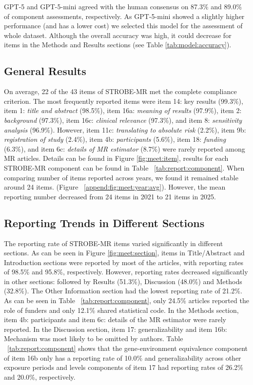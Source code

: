 GPT-5 and GPT-5-mini agreed with the human consensus on 87.3\% and 89.0\% of component assessments, respectively. As GPT-5-mini showed a slightly higher performance (and has a lower cost) we selected this model for the assessment of whole dataset. Although the overall accuracy was high, it could decrease for items in the Methods and Results sections (see Table \ref{tab:model:accuracy}).




\subsection{General Results}

On average, 22 of the 43 items of STROBE-MR met the complete compliance criterion. The most frequently reported items were item 14: key results (99.3\%), item 1: \textit{title and abstract} (98.5\%), item 16a: \textit{meaning of results} (97.9\%), item 2: \textit{background} (97.3\%), item 16c: \textit{clinical relevance} (97.3\%), and item 8: \textit{sensitivity analysis} (96.9\%). However, item 11c: \textit{translating to absolute risk} (2.2\%), item 9b: \textit{registration of study} (2.4\%), item 4b: \textit{participants} (5.6\%), item 18: \textit{funding} (6.3\%), and item 6c: \textit{details of MR estimator} (8.7\%) were rarely reported among MR articles. Details can be found in Figure \ref{fig:meet:item}, results for each STROBE-MR component can be found in Table ~\ref{tab:report:component}. When comparing number of items reported across years, we found it remained stable around 24 items. (Figure ~\ref{append:fig:meet:year:avg}). However, the mean reporting number decreased from 24 items in 2021 to 21 items in 2025.

% 

\subsection{Reporting Trends in Different Sections}

The reporting rate of STROBE-MR items varied significantly in different sections. As can be seen in Figure \ref{fig:meet:section}, items in Title/Abstract and Introduction sections were reported by most of the articles, with reporting rates of 98.5\% and 95.8\%, respectively. However, reporting rates decreased significantly in other sections: followed by Results (51.3\%), Discussion (48.0\%) and Methods (32.8\%). The Other Information section had the lowest reporting rate of 21.2\%. As can be seen in Table ~\ref{tab:report:component}, only 24.5\% articles reported the role of funders and only 12.1\% shared statistical code. In the Methods section, item 4b: participants and item 6c: details of the MR estimator were rarely reported. 
In the Discussion section, item 17: generalizability and item 16b: Mechanism was most likely to be omitted by authors. 
Table ~\ref{tab:report:component} shows that the gene-environment equivalence component of item 16b only has a reporting rate of 10.0\% and generalizability across other exposure periods and levels components of item 17 had reporting rates of 26.2\% and 20.0\%, respectively. 

